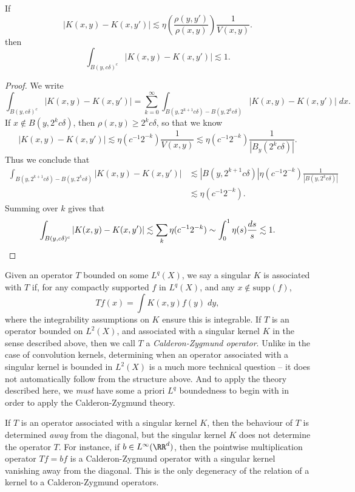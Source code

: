 \begin{lemma}
    If
    \[ |K(x,y) - K(x,y')| \lesssim \eta \left( \frac{\rho(y,y')}{\rho(x,y)} \right) \frac{1}{V(x,y)}. \]
    then
    \[ \int_{B(y,c\delta)^c} |K(x,y) - K(x,y')| \lesssim 1. \]
\end{lemma}
\begin{proof}
    We write
    \[ \int_{B(y,c\delta)^c} |K(x,y) - K(x,y')| = \sum_{k = 0}^\infty \int_{B(y, 2^{k+1} c \delta ) - B(y, 2^k c \delta)} |K(x,y) - K(x,y')|\; dx. \]
    If $x \not \in B(y,2^k c \delta)$, then $\rho(x,y) \geq 2^k c \delta$, so that we know
    \[ |K(x,y) - K(x,y')| \lesssim \eta \left( c^{-1} 2^{-k} \right) \frac{1}{V(x,y)} \lesssim \eta \left( c^{-1} 2^{-k} \right) \frac{1}{|B_y(2^k c \delta)|}. \]
    Thus we conclude that
    \begin{align*}
        \int_{B(y, 2^{k+1} c \delta) - B(y, 2^k c \delta)} |K(x,y) - K(x,y')| &\lesssim |B(y,2^{k+1} c \delta)| \eta \left( c^{-1} 2^{-k} \right) \frac{1}{|B(y,2^k c \delta)|}\\
        &\lesssim \eta ( c^{-1} 2^{-k} ).
    \end{align*}
    Summing over $k$ gives that
    \[ \int_{B(y,c\delta)^c} |K(x,y) - K(x,y')| \lesssim \sum_k \eta( c^{-1} 2^{-k} ) \sim \int_0^1 \eta(s) \frac{ds}{s} \lesssim 1. \qedhere \]
\end{proof}

Given an operator $T$ bounded on some $L^q(X)$, we say a singular $K$ is associated with $T$ if, for any compactly supported $f$ in $L^q(X)$, and any $x \not \in \text{supp}(f)$,
%
\[ Tf(x) = \int K(x,y) f(y)\; dy, \]
%
where the integrability assumptions on $K$ ensure this is integrable. If $T$ is an operator bounded on $L^2(X)$, and associated with a singular kernel $K$ in the sense described above, then we call $T$ a \emph{Calderon-Zygmund operator}. Unlike in the case of convolution kernels, determining when an operator associated with a singular kernel is bounded in $L^2(X)$ is a much more technical question -- it does not automatically follow from the structure above. And to apply the theory described here, we \emph{must} have some a priori $L^q$ boundedness to begin with in order to apply the Calderon-Zygmund theory.

If $T$ is an operator associated with a singular kernel $K$, then the behaviour of $T$ is determined \emph{away} from the diagonal, but the singular kernel $K$ does not determine the operator $T$. For instance, if $b \in L^\infty(\RR^d)$, then the pointwise multiplication operator $Tf = bf$ is a Calderon-Zygmund operator with a singular kernel vanishing away from the diagonal. This is the only degeneracy of the relation of a kernel to a Calderon-Zygmund operators.

